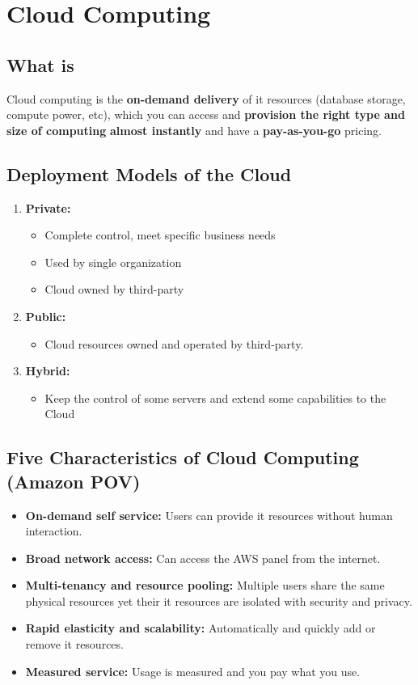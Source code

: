 \section{Cloud Computing}

\subsection{What is}

Cloud computing is the \textbf{on-demand delivery} of it resources (database storage, compute power, etc), which you can access and \textbf{provision the right type and size of computing} \textbf{almost instantly} and have a \textbf{pay-as-you-go} pricing.

\subsection{Deployment Models of the Cloud}

\begin{enumerate}
	\item \textbf{Private:}
	\begin{itemize}
		\item Complete control, meet specific business needs
		\item Used by single organization
		\item Cloud owned by third-party
	\end{itemize}
  	\item \textbf{Public:}
  	\begin{itemize}
  		\item Cloud resources owned and operated by third-party.
  	\end{itemize}
  	\item \textbf{Hybrid:}
  	\begin{itemize}
  		\item Keep the control of some servers and extend  some capabilities to the Cloud
  	\end{itemize}
\end{enumerate}

\subsection{Five Characteristics of Cloud Computing (Amazon POV)}

\begin{itemize}
	\item \textbf{On-demand self service:} Users can provide it resources without human interaction.
	\item \textbf{Broad network access:} Can access the AWS panel from the internet.
	\item \textbf{Multi-tenancy and resource pooling:} Multiple users share the same physical resources yet their it resources are isolated with security and privacy.
	\item \textbf{Rapid elasticity and scalability:} Automatically and quickly add or remove it resources.
	\item \textbf{Measured service:} Usage is measured and you pay what you use.
\end{itemize}

